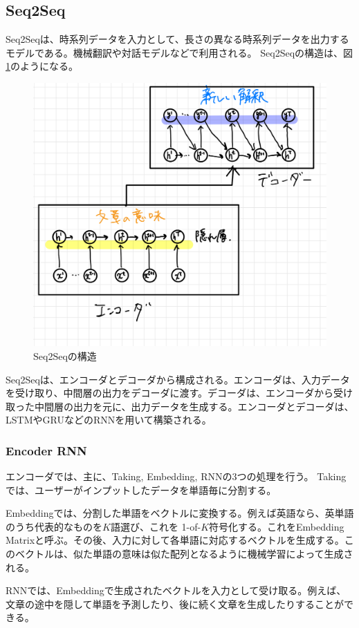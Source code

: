 \documentclass{ltjsarticle}
\begin{document}
\subsection{Seq2Seq}
Seq2Seqは、時系列データを入力として、長さの異なる時系列データを出力するモデルである。機械翻訳や対話モデルなどで利用される。
Seq2Seqの構造は、図\ref{fig:Seq2Seq}のようになる。
\begin{figure}[htbp]
  \centering
  \includegraphics[width=13cm]{./capture/Seq2Seq.png}
  \caption{Seq2Seqの構造}
  \label{fig:Seq2Seq}
\end{figure}

Seq2Seqは、エンコーダとデコーダから構成される。エンコーダは、入力データを受け取り、中間層の出力をデコーダに渡す。デコーダは、エンコーダから受け取った中間層の出力を元に、出力データを生成する。エンコーダとデコーダは、LSTMやGRUなどのRNNを用いて構築される。

\subsubsection{Encoder RNN}
エンコーダでは、主に、Taking, Embedding, RNNの3つの処理を行う。
Takingでは、ユーザーがインプットしたデータを単語毎に分割する。
\par
Embeddingでは、分割した単語をベクトルに変換する。例えば英語なら、英単語のうち代表的なものを$K$語選び、これを 1-of-$K$符号化する。これをEmbedding Matrixと呼ぶ。その後、入力に対して各単語に対応するベクトルを生成する。このベクトルは、似た単語の意味は似た配列となるように機械学習によって生成される。
\par
RNNでは、Embeddingで生成されたベクトルを入力として受け取る。例えば、文章の途中を隠して単語を予測したり、後に続く文章を生成したりすることができる。
\end{document}
